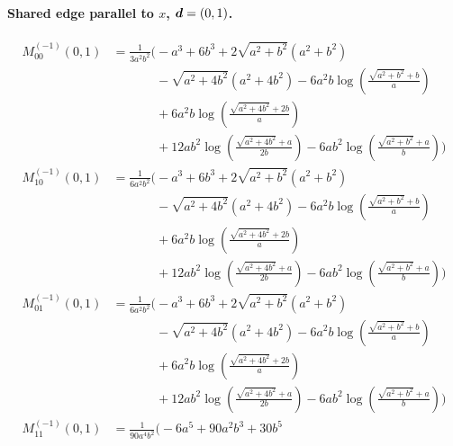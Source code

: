 \paragraph{Shared edge parallel to $x$, $\vb*{d}=(0,1)$.}
\begin{align*}
M^{(-1)}_{00}(0,1) &= \frac{1}{3 a^{2} b^{2}}\Bigg(- a^{3} + 6 b^{3} + 2 \sqrt{a^{2} + b^{2}}\left(a^{2} + b^{2}\right)\\
&\phantom{{}=\frac{1}{3 a^{2} b^{2}}\Bigg(}- \sqrt{a^{2} + 4 b^{2}}\left(a^{2} + 4 b^{2}\right) - 6 a^{2} b \log\left(\frac{\sqrt{a^{2} + b^{2}} + b}{a}\right)\\
&\phantom{{}=\frac{1}{3 a^{2} b^{2}}\Bigg(}+ 6 a^{2} b \log\left(\frac{\sqrt{a^{2} + 4 b^{2}} + 2 b}{a}\right)\\
&\phantom{{}=\frac{1}{3 a^{2} b^{2}}\Bigg(}+ 12 a b^{2} \log\left(\frac{\sqrt{a^{2} + 4 b^{2}} + a}{2 b}\right) - 6 a b^{2} \log\left(\frac{\sqrt{a^{2} + b^{2}} + a}{b}\right)\Bigg)\\[1.2ex]
M^{(-1)}_{10}(0,1) &= \frac{1}{6 a^{2} b^{2}}\Bigg(- a^{3} + 6 b^{3} + 2 \sqrt{a^{2} + b^{2}}\left(a^{2} + b^{2}\right)\\
&\phantom{{}=\frac{1}{6 a^{2} b^{2}}\Bigg(}- \sqrt{a^{2} + 4 b^{2}}\left(a^{2} + 4 b^{2}\right) - 6 a^{2} b \log\left(\frac{\sqrt{a^{2} + b^{2}} + b}{a}\right)\\
&\phantom{{}=\frac{1}{6 a^{2} b^{2}}\Bigg(}+ 6 a^{2} b \log\left(\frac{\sqrt{a^{2} + 4 b^{2}} + 2 b}{a}\right)\\
&\phantom{{}=\frac{1}{6 a^{2} b^{2}}\Bigg(}+ 12 a b^{2} \log\left(\frac{\sqrt{a^{2} + 4 b^{2}} + a}{2 b}\right) - 6 a b^{2} \log\left(\frac{\sqrt{a^{2} + b^{2}} + a}{b}\right)\Bigg)\\[1.2ex]
M^{(-1)}_{01}(0,1) &= \frac{1}{6 a^{2} b^{2}}\Bigg(- a^{3} + 6 b^{3} + 2 \sqrt{a^{2} + b^{2}}\left(a^{2} + b^{2}\right)\\
&\phantom{{}=\frac{1}{6 a^{2} b^{2}}\Bigg(}- \sqrt{a^{2} + 4 b^{2}}\left(a^{2} + 4 b^{2}\right) - 6 a^{2} b \log\left(\frac{\sqrt{a^{2} + b^{2}} + b}{a}\right)\\
&\phantom{{}=\frac{1}{6 a^{2} b^{2}}\Bigg(}+ 6 a^{2} b \log\left(\frac{\sqrt{a^{2} + 4 b^{2}} + 2 b}{a}\right)\\
&\phantom{{}=\frac{1}{6 a^{2} b^{2}}\Bigg(}+ 12 a b^{2} \log\left(\frac{\sqrt{a^{2} + 4 b^{2}} + a}{2 b}\right) - 6 a b^{2} \log\left(\frac{\sqrt{a^{2} + b^{2}} + a}{b}\right)\Bigg)\\[1.2ex]
M^{(-1)}_{11}(0,1) &= \frac{1}{90 a^{4} b^{2}}\Bigg(- 6 a^{5} + 90 a^{2} b^{3} + 30 b^{5}\\

\end{align*}
